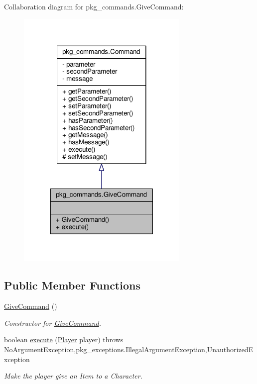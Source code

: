 Collaboration diagram for pkg\-\_\-commands.\-Give\-Command\-:\nopagebreak
\begin{figure}[H]
\begin{center}
\leavevmode
\includegraphics[width=234pt]{classpkg__commands_1_1GiveCommand__coll__graph}
\end{center}
\end{figure}
\subsection*{Public Member Functions}
\begin{DoxyCompactItemize}
\item 
\hyperlink{classpkg__commands_1_1GiveCommand_a04e020a1f124119a2e7df19fac983953}{Give\-Command} ()
\begin{DoxyCompactList}\small\item\em Constructor for \hyperlink{classpkg__commands_1_1GiveCommand}{Give\-Command}. \end{DoxyCompactList}\item 
boolean \hyperlink{classpkg__commands_1_1GiveCommand_a3a3cca7fae9b86d8ff85cc166564843d}{execute} (\hyperlink{classpkg__world_1_1Player}{Player} player)  throws No\-Argument\-Exception,pkg\-\_\-exceptions.\-Illegal\-Argument\-Exception,\-Unauthorized\-Exception 
\begin{DoxyCompactList}\small\item\em Make the player give an Item to a Character. \end{DoxyCompactList}\end{DoxyCompactItemize}
